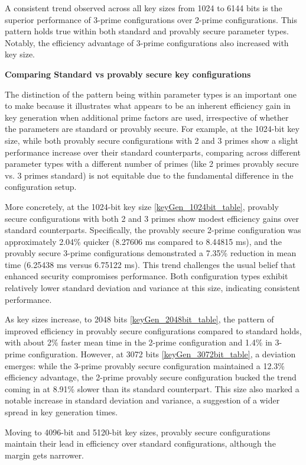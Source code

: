 \documentclass[]{final_report}
\theoremstyle{definition}
\begin{document}
A consistent trend observed across all key sizes from 1024 to 6144 bits is the superior performance of 3-prime configurations over 2-prime configurations. This pattern holds true within both standard and provably secure parameter types. Notably, the efficiency advantage of 3-prime configurations also increased with key size.


\textbf{Comparing Standard vs provably secure key configurations}

The distinction of the pattern being within parameter types is an important one to make because it illustrates what appears to be an inherent efficiency gain in key generation when additional prime factors are used, irrespective of whether the parameters are standard or provably secure. For example, at the 1024-bit key size, while both provably secure configurations with 2 and 3 primes show a slight performance increase over their standard counterparts, comparing across different parameter types with a different number of primes (like 2 primes provably secure vs. 3 primes standard) is not equitable due to the fundamental difference in the configuration setup.

More concretely, at the 1024-bit key size \ref{keyGen_1024bit_table}, provably secure configurations with both 2 and 3 primes show modest efficiency gains over standard counterparts. Specifically, the provably secure 2-prime configuration was approximately 2.04\% quicker (8.27606 ms compared to 8.44815 ms), and the provably secure 3-prime configurations demonstrated a 7.35\% reduction in mean time (6.25438 ms versus 6.75122 ms). This trend challenges the usual belief that enhanced security compromises performance. Both configuration types exhibit relatively lower standard deviation and variance at this size, indicating consistent performance.

As key sizes increase, to 2048 bits \ref{keyGen_2048bit_table}, the pattern of improved efficiency in provably secure configurations compared to standard holds, with about 2\% faster mean time in the  2-prime configuration and 1.4\% in 3-prime configuration. However, at 3072 bits  \ref{keyGen_3072bit_table}, a deviation emerges: while the 3-prime provably secure configuration maintained a 12.3\% efficiency advantage, the  2-prime provably secure configuration bucked the trend coming in at 8.91\% slower than its standard counterpart. This size also marked a notable increase in standard deviation and variance, a suggestion of a wider spread in key generation times.

Moving to 4096-bit  and 5120-bit key sizes, provably secure configurations maintain their lead in efficiency over standard configurations, although the margin gets narrower. 
\end{document}
